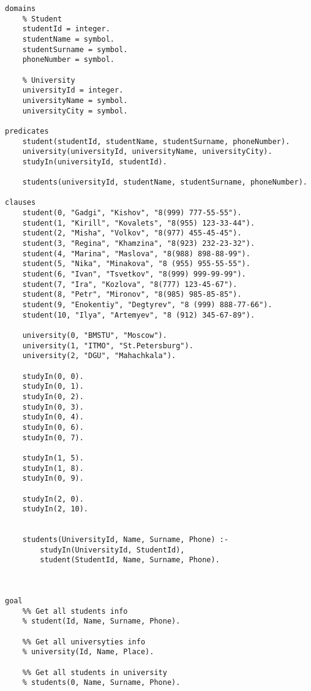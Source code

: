 \begin{lstlisting}
domains
	% Student
	studentId = integer.
	studentName = symbol.
	studentSurname = symbol.
	phoneNumber = symbol.
	
	% University
	universityId = integer.
	universityName = symbol.
	universityCity = symbol.
	
predicates
	student(studentId, studentName, studentSurname, phoneNumber).
	university(universityId, universityName, universityCity).
	studyIn(universityId, studentId).
	
	students(universityId, studentName, studentSurname, phoneNumber).
	
clauses
	student(0, "Gadgi", "Kishov", "8(999) 777-55-55").
	student(1, "Kirill", "Kovalets", "8(955) 123-33-44").
	student(2, "Misha", "Volkov", "8(977) 455-45-45").
	student(3, "Regina", "Khamzina", "8(923) 232-23-32").
	student(4, "Marina", "Maslova", "8(988) 898-88-99").
	student(5, "Nika", "Minakova", "8 (955) 955-55-55").
	student(6, "Ivan", "Tsvetkov", "8(999) 999-99-99").
	student(7, "Ira", "Kozlova", "8(777) 123-45-67").
	student(8, "Petr", "Mironov", "8(985) 985-85-85").
	student(9, "Enokentiy", "Degtyrev", "8 (999) 888-77-66").
	student(10, "Ilya", "Artemyev", "8 (912) 345-67-89").
	
	university(0, "BMSTU", "Moscow").
	university(1, "ITMO", "St.Petersburg").
	university(2, "DGU", "Mahachkala").
	
	studyIn(0, 0).
	studyIn(0, 1).
	studyIn(0, 2).
	studyIn(0, 3).
	studyIn(0, 4).
	studyIn(0, 6).
	studyIn(0, 7).
	
	studyIn(1, 5).
	studyIn(1, 8).
	studyIn(0, 9).
	
	studyIn(2, 0).
	studyIn(2, 10).
	
	
	students(UniversityId, Name, Surname, Phone) :-
		studyIn(UniversityId, StudentId),
		student(StudentId, Name, Surname, Phone).
	
	
	
goal
	%% Get all students info
	% student(Id, Name, Surname, Phone).
	
	%% Get all universyties info
	% university(Id, Name, Place).
	
	%% Get all students in university
	% students(0, Name, Surname, Phone).
\end{lstlisting}
